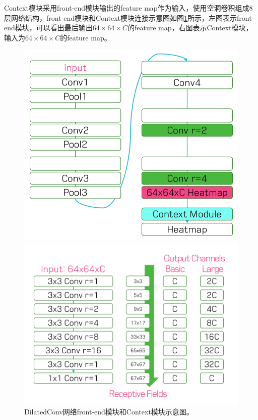 \documentclass[cn]{elegantbook}
\begin{document}
Context模块采用front-end模块输出的feature map作为输入，使用空洞卷积组成8层网络结构，front-end模块和Context模块连接示意图如图\ref{dilate}所示，左图表示front-end模块，可以看出最后输出$64\times64\times C$的feature map，右图表示Context模块，输入为$64\times64\times C$的feature map。
\begin{figure}[!h]
	\centering
	\begin{minipage}[t]{0.45\textwidth}
		\centering
		\includegraphics[width=\textwidth]{images/frontmodule}
	\end{minipage}
	\begin{minipage}[t]{0.45\textwidth}
		\centering
		\includegraphics[width=\textwidth]{images/Contextmodule}
	\end{minipage}
	\caption{\label{dilate}DilatedConv网络front-end模块和Context模块示意图。}
\end{figure}
\end{document}
